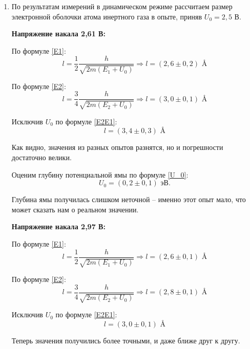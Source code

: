 	\begin{enumerate}
		\item По результатам измерений в динамическом режиме рассчитаем размер электронной оболочки атома инертного газа в опыте, приняв $U_0 = 2,5$ В.
		
		\textbf{Напряжение накала 2,61 В:}
		
		По формуле \eqref{E1}:
		\begin{equation*}
			l = \frac{1}{2}\frac{h}{\sqrt{2m(E_1 + U_0)}} \Longrightarrow l = (2,6 \pm 0,2) \text{ \AA}
		\end{equation*}
	
		По формуле \eqref{E2}:
		\begin{equation*}
			l = \frac{3}{4}\frac{h}{\sqrt{2m(E_2 + U_0)}} \Longrightarrow l = (3,0 \pm 0,1) \text{ \AA}
		\end{equation*}
	
		Исключив $U_0$ по формуле \eqref{E2E1}:
		\begin{equation*}
			l = (3,4 \pm 0,3) \text{ \AA}
		\end{equation*}
	
		Как видно, значения из разных опытов разнятся, но и погрешности достаточно велики. 
		
		Оценим глубину потенциальной ямы по формуле \eqref{U_0}:
		\begin{equation*}
			U_0 = (0,2 \pm 0,1) \text{ эВ}.
		\end{equation*}
	
		Глубина ямы получилась слишком неточной -- именно этот опыт мало, что может сказать нам о реальном значении.
		
		\textbf{Напряжение накала 2,97 В:}
		
		По формуле \eqref{E1}:
		\begin{equation*}
			l = \frac{1}{2}\frac{h}{\sqrt{2m(E_1 + U_0)}} \Longrightarrow l = (2,6 \pm 0,1) \text{ \AA}
		\end{equation*}
		
		По формуле \eqref{E2}:
		\begin{equation*}
			l = \frac{3}{4}\frac{h}{\sqrt{2m(E_2 + U_0)}} \Longrightarrow l = (2,8 \pm 0,1) \text{ \AA}
		\end{equation*}
		
		Исключив $U_0$ по формуле \eqref{E2E1}:
		\begin{equation*}
			l = (3,0 \pm 0,1) \text{ \AA}
		\end{equation*}
		
		Теперь значения получились более точными, и даже ближе друг к другу.
		

\end{enumerate}
